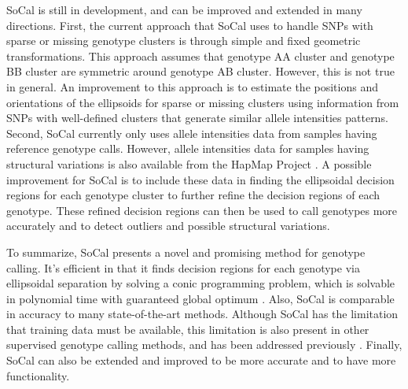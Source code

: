 \documentclass{scrartcl}
\begin{document}
\par
SoCal is still in development, and can be improved and extended in
many directions.
First, the current approach that SoCal uses to handle SNPs with sparse or
missing genotype clusters is through simple and fixed geometric
transformations.
This approach assumes that genotype AA cluster and genotype BB cluster are
symmetric around genotype AB cluster.
However, this is not true in general.
An improvement to this approach is to estimate the positions and orientations
of the ellipsoids for sparse or missing clusters using information from
SNPs with well-defined clusters that generate similar allele
intensities patterns. 
Second, SoCal currently only uses allele intensities data from samples having
reference genotype calls.
However, allele intensities data for samples having structural variations is
also available from the HapMap Project \cite{hapmap2003}.
A possible improvement for SoCal is to include these data in finding the
ellipsoidal decision regions for each genotype cluster to further refine the
decision regions of each genotype.
These refined decision regions can then be used to call genotypes more
accurately and to detect outliers and possible structural variations.

\par
To summarize, SoCal presents a novel and promising method for genotype calling.
It's efficient in that it finds decision regions for each genotype via
ellipsoidal separation by solving a conic programming problem, which is
solvable in polynomial time with guaranteed global optimum \cite{glineur1998}.
Also, SoCal is comparable in accuracy to many state-of-the-art methods.
Although SoCal has the limitation that training data must be available, this
limitation is also present in other supervised genotype calling methods, and
has been addressed previously \cite{carvalho2007}.
Finally, SoCal can also be extended and improved to be more accurate and to
have more functionality.
\end{document}
